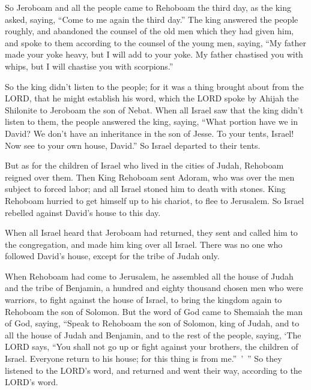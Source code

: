 \myverse{}So Jeroboam and all the people came to Rehoboam the third day,
as the king asked, saying, “Come to me again the third day.”
\myverse{}The king answered the people roughly, and abandoned the counsel of the old
men which they had given him,
\myverse{}and spoke to them according to the counsel of the young men, saying, “My
father made your yoke heavy, but I will add to your yoke. My father chastised you with whips, but I will
chastise you with scorpions.”

\myverse{}So the king didn’t listen to the people; for it was a thing
brought about from the LORD, that he might establish his word, which the LORD spoke by Ahijah the Shilonite
to Jeroboam the son of Nebat.
\myverse{}When all Israel saw that the king didn’t listen to them, the people answered
the king, saying, “What portion have we in David? We don’t have an inheritance in the son of Jesse. To
your tents, Israel! Now see to your own house, David.” So Israel departed to their tents.

\myverse{}But as for the children of Israel who lived in the cities of
Judah, Rehoboam reigned over them.
\myverse{}Then King Rehoboam sent Adoram, who was over the men subject to forced labor;
and all Israel stoned him to death with stones. King Rehoboam hurried to get himself up to his chariot,
to flee to Jerusalem.
\myverse{}So Israel rebelled against David’s house to this day.

\myverse{}When all Israel heard that Jeroboam had returned, they sent
and called him to the congregation, and made him king over all Israel. There was no one who followed David’s
house, except for the tribe of Judah only.

\myverse{}When Rehoboam had come to Jerusalem, he assembled all the house
of Judah and the tribe of Benjamin, a hundred and eighty thousand chosen men who were warriors, to fight
against the house of Israel, to bring the kingdom again to Rehoboam the son of Solomon.
\myverse{}But the word of God came to Shemaiah the man of God, saying,
\myverse{}“Speak to Rehoboam the son of Solomon, king of Judah, and to all the house
of Judah and Benjamin, and to the rest of the people, saying,
\myverse{}‘The LORD says, “You shall not go up or fight against your brothers, the
children of Israel. Everyone return to his house; for this thing is from me.” ’ ” So they listened to the
LORD’s word, and returned and went their way, according to the LORD’s word.

